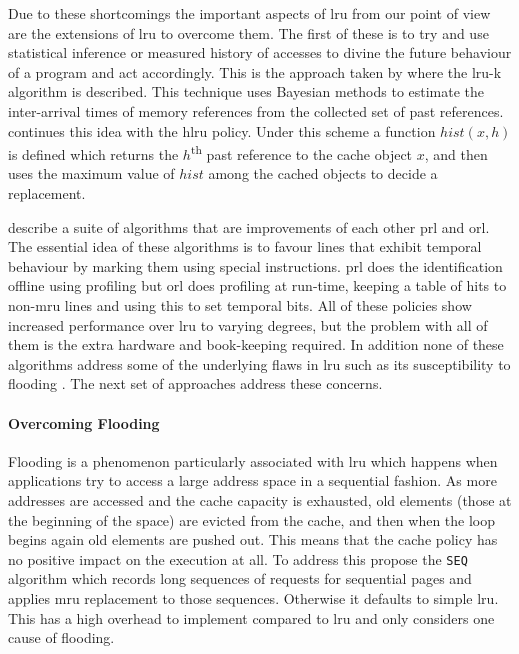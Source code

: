 Due to these shortcomings the important aspects of \gls{lru} from our point of view are the extensions of \gls{lru} to overcome them. The first of these is to try and use statistical inference or measured history of accesses to divine the future behaviour of a program and act accordingly. This is the approach taken by \citet{oneilLRUKPageReplacement1993} where the \gls{lru-k} algorithm is described. This technique uses Bayesian methods to estimate the inter-arrival times of memory references from the collected set of past references. \citet{vakaliLRUbasedAlgorithmsWeb2000} continues this idea with the \gls{hlru} policy. Under this scheme a function $hist(x,h)$ is defined which returns the $h$\textsuperscript{th} past reference to the cache object $x$, and then uses the maximum value of $hist$ among the cached objects to decide a replacement.

\citet{wongModifiedLRUPolicies2000} describe a suite of algorithms that are improvements of each other \gls{prl} and \gls{orl}. The essential idea of these algorithms is to favour lines that exhibit temporal behaviour by marking them using special instructions. \gls{prl} does the identification offline using profiling but \gls{orl} does profiling at run-time, keeping a table of hits to non-\gls{mru} lines and using this to set temporal bits. All of these policies show increased performance over \gls{lru} to varying degrees, but the problem with all of them is the extra hardware and book-keeping required. In addition none of these algorithms address some of the underlying flaws in \gls{lru} such as its susceptibility to flooding \cite{glassAdaptivePageReplacement1997}. The next set of approaches address these concerns.

\paragraph{Overcoming Flooding}


Flooding is a phenomenon particularly associated with \gls{lru} which happens when applications try to access a large address space in a sequential fashion. As more addresses are accessed and the cache capacity is exhausted, old elements (those at the beginning of the space) are evicted from the cache, and then when the loop begins again old elements are pushed out. This means that the cache policy has no positive impact on the execution at all. To address this \citet{glassAdaptivePageReplacement1997} propose the \texttt{SEQ} algorithm which records long sequences of requests for sequential pages and applies \gls{mru} replacement to those sequences. Otherwise it defaults to simple \gls{lru}. This has a high overhead to implement compared to \gls{lru} and only considers one cause of flooding. 

